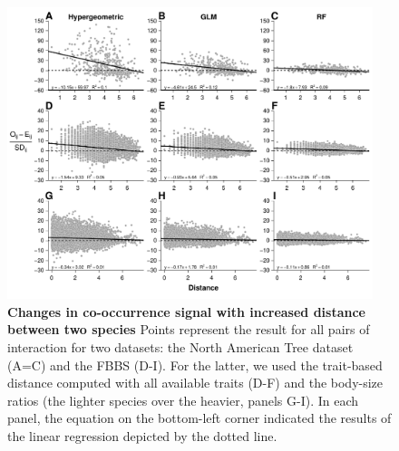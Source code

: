 \newpage

\begin{figure}
\centering
\includegraphics[width=0.95000\textwidth]{chapitre3/figS6.pdf}
\caption{\textbf{Changes in co-occurrence signal with increased distance
between two species} Points represent the result for all pairs of
interaction for two datasets: the North American Tree dataset (A=C) and
the FBBS (D-I). For the latter, we used the trait-based distance
computed with all available traits (D-F) and the body-size ratios (the
lighter species over the heavier, panels G-I). In each panel, the
equation on the bottom-left corner indicated the results of the linear
regression depicted by the dotted line.\label{fig:distrev}}
\end{figure}

\newpage

